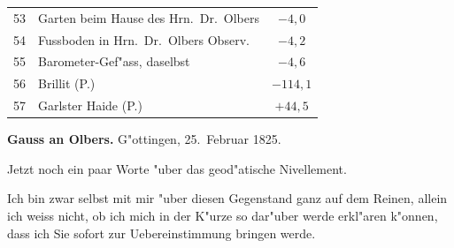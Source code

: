 \documentclass[12pt,a4paper]{article}
\theoremstyle{plain}
\theoremstyle{definition}
\theoremstyle{remark}
\begin{document}
\begin{tabular}{r|l|c}
53 & \quad\quad\quad\quad\quad\quad\quad\quad\quad\quad\quad Garten beim Hause des Hrn.\ Dr.\ Olbers & $-4,\!0$ \\
54 & \quad\quad\quad\quad\quad\quad\quad\quad\quad\quad\quad Fussboden in Hrn.\ Dr.\ Olbers Observ. & $-4,\!2$ \\
55 & \quad\quad\quad\quad\quad\quad\quad\quad\quad\quad\quad Barometer-Gef"ass, daselbst & $-4,\!6$ \\
56 & Brillit (P.) & $-114,\!1$ \\
57 & Garlster Haide (P.) & $+44,\!5$ \\
\hline
\end{tabular}

\newpage
\noindent \textbf{Gauss an Olbers.} G"ottingen, 25.~Februar 1825.

\medskip
\noindent Jetzt noch ein paar Worte "uber das geod"atische Nivellement.

Ich bin zwar selbst mit mir "uber diesen Gegenstand ganz auf dem Reinen, allein ich weiss nicht, ob ich mich in der K"urze so dar"uber werde erkl"aren k"onnen, dass ich Sie sofort zur Uebereinstimmung bringen werde.
\end{document}
